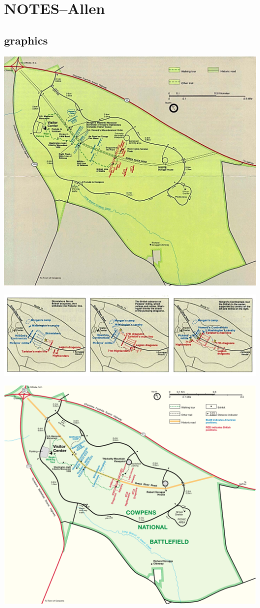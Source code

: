 
\section{NOTES--Allen}

\subsection{graphics}

\par\includegraphics[width=6in]{gfx/cowp_95}
\par\includegraphics[width=6in]{gfx/cowp_batt95}
\par\includegraphics[width=6in]{gfx/cowpens_park97}

